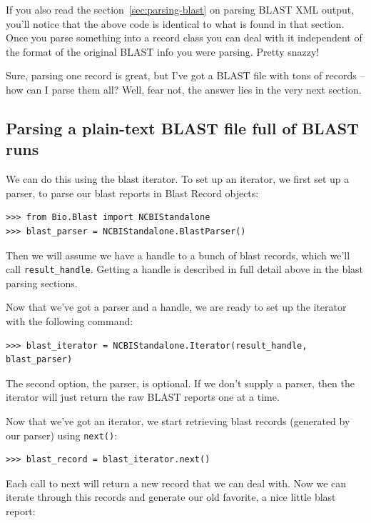 \documentclass{report}
\begin{document}
If you also read the section~\ref{sec:parsing-blast} on parsing BLAST XML output, you'll notice that the above code is identical to what is found in that section. Once you parse something into a record class you can deal with it independent of the format of the original BLAST info you were parsing. Pretty snazzy!

Sure, parsing one record is great, but I've got a BLAST file with tons of records -- how can I parse them all? Well, fear not, the answer lies in the very next section.

\subsection{Parsing a plain-text BLAST file full of BLAST runs}

We can do this using the blast iterator. To set up an iterator, we first set up a parser, to parse our blast reports in Blast Record objects:

\begin{verbatim}
>>> from Bio.Blast import NCBIStandalone
>>> blast_parser = NCBIStandalone.BlastParser()
\end{verbatim}

Then we will assume we have a handle to a bunch of blast records, which we'll call \verb|result_handle|. Getting a handle is described in full detail above in the blast parsing sections.

Now that we've got a parser and a handle, we are ready to set up the iterator with the following command:

\begin{verbatim}
>>> blast_iterator = NCBIStandalone.Iterator(result_handle, blast_parser)
\end{verbatim}

The second option, the parser, is optional. If we don't supply a parser, then the iterator will just return the raw BLAST reports one at a time.

Now that we've got an iterator, we start retrieving blast records (generated by our parser) using \verb|next()|:

\begin{verbatim}
>>> blast_record = blast_iterator.next()
\end{verbatim}

Each call to next will return a new record that we can deal with. Now we can iterate through this records and generate our old favorite, a nice little blast report:
\end{document}

